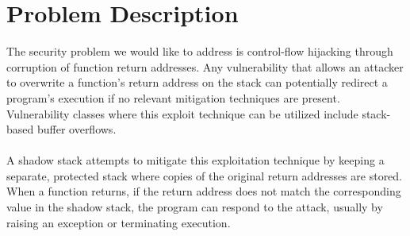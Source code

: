 \documentclass{article}
\begin{document}
\section{Problem Description}
The security problem we would like to address is control-flow hijacking through corruption of function return addresses. Any vulnerability that allows an attacker to overwrite a function's return address on the stack can potentially redirect a program's execution if no relevant mitigation techniques are present. Vulnerability classes where this exploit technique can be utilized include stack-based buffer overflows.
\\
\\
A shadow stack attempts to mitigate this exploitation technique by keeping a separate, protected stack where copies of the original return addresses are stored. When a function returns, if the return address does not match the corresponding value in the shadow stack, the program can respond to the attack, usually by raising an exception or terminating execution.
\end{document}
